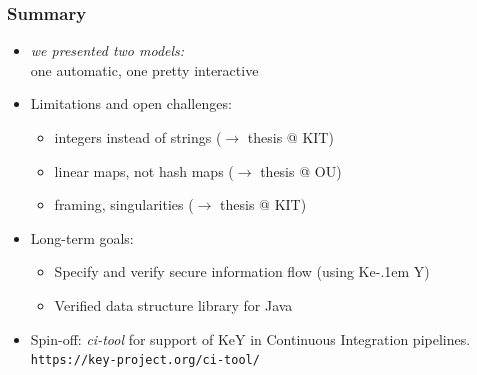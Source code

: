\documentclass{beamer}
\newcommand{\KeY}{Ke\kern-.1em Y}
\begin{document}
\begin{frame}
  \frametitle{Summary}
  \begin{itemize} \itemsep3ex
  \item \emph{we presented two models:} \\
    one automatic, one pretty interactive
  \item Limitations and open challenges:
    \begin{itemize}
    \item integers instead of strings ($\to$ thesis @ KIT)
    \item linear maps, not hash maps ($\to$ thesis @ OU)
    \item framing, singularities ($\to$ thesis @ KIT)
    \end{itemize}
  \item Long-term goals:
    \begin{itemize}
    \item Specify and verify secure information flow (using \KeY)
    \item Verified data structure library for Java
    \end{itemize}
    \item Spin-off: \emph{ci-tool} for support of KeY in Continuous Integration
     pipelines. \small
    \texttt{https://key-project.org/ci-tool/}
  \end{itemize}
\end{frame}
\end{document}

